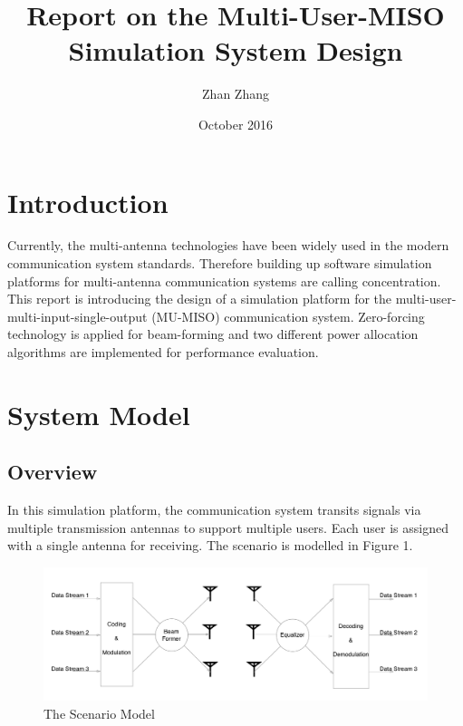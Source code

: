 \documentclass{article}
\title{Report on the Multi-User-MISO Simulation System Design}
\author{Zhan Zhang}
\date{October 2016}
\begin{document}
\maketitle

\section{Introduction}
Currently, the multi-antenna technologies have been widely used in the modern communication system standards. Therefore building up software simulation platforms for multi-antenna communication systems are calling concentration.
This report is introducing the design of a simulation platform for 
the multi-user-multi-input-single-output (MU-MISO) communication system. 
Zero-forcing technology is applied for beam-forming and two different 
power allocation algorithms are implemented for performance evaluation.

\section{System Model}
\subsection{Overview}
In this simulation platform, the communication system transits signals via multiple transmission antennas to support multiple users. Each user is assigned with a single antenna for receiving. The scenario is modelled in Figure 1.
\begin{figure}[ht]
\centering
\includegraphics[scale=0.18]{Scenario.png}
\caption{The Scenario Model}
\label{fig:Scenario}
\end{figure}
\end{document}
